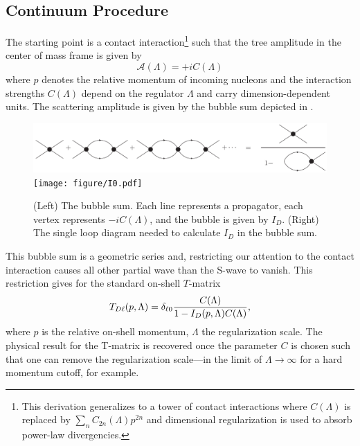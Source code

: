 \subsection{Continuum Procedure}\label{sec:continuum}
The starting point is a contact interaction\footnote{This derivation generalizes to a tower of contact interactions where $C(\Lambda)$ is replaced by $\sum_n C_{2n}(\Lambda) p^{2n}$ \cite{Kaplan:1998we,Beane:2003da} and dimensional regularization is used to absorb power-law divergencies.} such that the tree amplitude in the center of mass frame is given by
\begin{equation}
    \mathcal A(\Lambda) = + i C(\Lambda)
\end{equation}
where $p$ denotes the relative momentum of incoming nucleons and the interaction strengths $ C(\Lambda)$ depend on the regulator $\Lambda$ and carry dimension-dependent units.
The scattering amplitude is given by the bubble sum depicted in .

\begin{figure}[ht!]
\center
\includegraphics[width=.675\columnwidth]{figure/bubbleSum.pdf}
\hfill
\texttt{[image: figure/I0.pdf]}
\caption{(Left) The bubble sum. Each line represents a propagator, each vertex represents $-i C(\Lambda)$, and the bubble is given by $I_D$.
(Right) The single loop diagram needed to calculate $I_D$ in the bubble sum.
\label{fig:bubbleSum}}
\end{figure}

This bubble sum is a geometric series and, restricting our attention to the contact interaction causes all other partial wave than the S-wave to vanish.
This restriction gives for the standard on-shell $T$-matrix
\begin{equation}\label{eq:T matrix}
T_{D\ell}(p, \Lambda) = \delta_{\ell 0} \frac{C(\Lambda)}{1-I_D(p,\Lambda) C(\Lambda)},
\end{equation}
where $p$ is the relative on-shell momentum, $\Lambda$ the regularization scale.
The physical result for the T-matrix is recovered once the parameter $C$ is chosen such that one can remove the regularization scale---in the limit of $\Lambda \to \infty$ for a hard momentum cutoff, for example.

